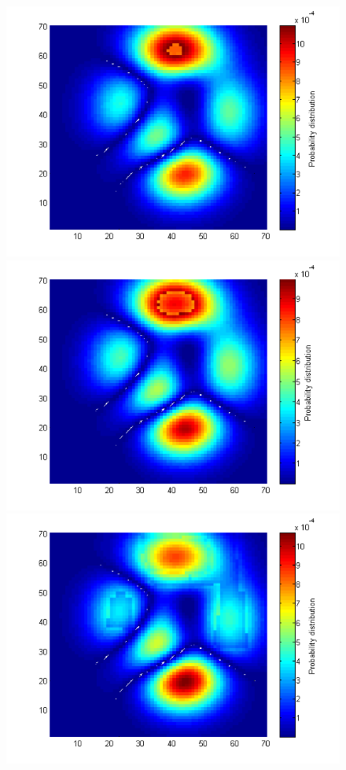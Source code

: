 \documentclass[a4paper]{article}
\begin{document}
\begin{figure}[H]\begin{center}
\includegraphics[scale=0.35]{../Matlab/Images/ModelSearch001.png}
\includegraphics[scale=0.35]{../Matlab/Images/ModelSearch020.png}
\includegraphics[scale=0.35]{../Matlab/Images/ModelSearch100.png}
\end{center}\end{figure}
\end{document}
